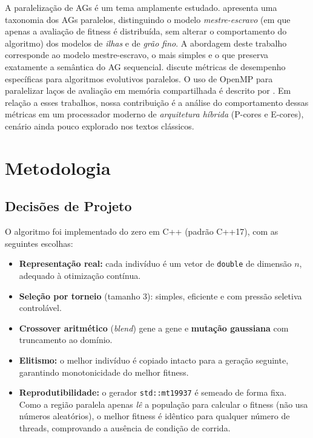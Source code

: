 \documentclass[12pt]{article}
\begin{document}
A paralelização de AGs é um tema amplamente estudado. \cite{cantupaz:98}
apresenta uma taxonomia dos AGs paralelos, distinguindo o modelo
\emph{mestre-escravo} (em que apenas a avaliação de fitness é distribuída, sem
alterar o comportamento do algoritmo) dos modelos de \emph{ilhas} e de
\emph{grão fino}. A abordagem deste trabalho corresponde ao modelo
mestre-escravo, o mais simples e o que preserva exatamente a semântica do AG
sequencial. \cite{alba:02} discute métricas de desempenho específicas para
algoritmos evolutivos paralelos. O uso de OpenMP para paralelizar laços de
avaliação em memória compartilhada é descrito por \cite{chapman:08}. Em
relação a esses trabalhos, nossa contribuição é a análise do comportamento
dessas métricas em um processador moderno de \emph{arquitetura híbrida}
(P-cores e E-cores), cenário ainda pouco explorado nos textos clássicos.

\section{Metodologia}

\subsection{Decisões de Projeto}

O algoritmo foi implementado do zero em C++ (padrão C++17), com as seguintes
escolhas:
\begin{itemize}
  \item \textbf{Representação real:} cada indivíduo é um vetor de \texttt{double}
    de dimensão $n$, adequado à otimização contínua.
  \item \textbf{Seleção por torneio} (tamanho 3): simples, eficiente e com
    pressão seletiva controlável.
  \item \textbf{Crossover aritmético} (\emph{blend}) gene a gene e
    \textbf{mutação gaussiana} com truncamento ao domínio.
  \item \textbf{Elitismo:} o melhor indivíduo é copiado intacto para a geração
    seguinte, garantindo monotonicidade do melhor fitness.
  \item \textbf{Reprodutibilidade:} o gerador \texttt{std::mt19937} é semeado
    de forma fixa. Como a região paralela apenas \emph{lê} a população para
    calcular o fitness (não usa números aleatórios), o melhor fitness é
    idêntico para qualquer número de threads, comprovando a ausência de
    condição de corrida.
\end{itemize}
\end{document}
